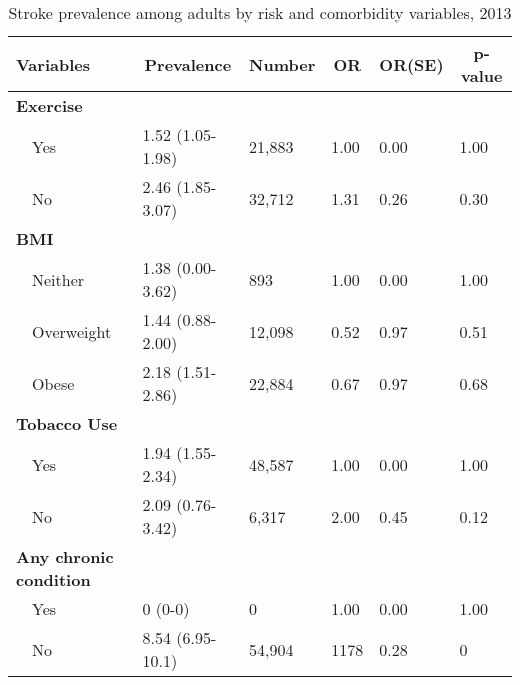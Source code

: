 
\begin{table}[H]
\caption{Stroke prevalence  among adults by risk and comorbidity variables, 2013\label{tab:riskComo.tabl}} 
\begin{center}
\begin{tabular}{llllll}
\hline\hline
\multicolumn{1}{l}{Variables}&\multicolumn{1}{c}{Prevalence}&\multicolumn{1}{c}{Number}&\multicolumn{1}{c}{OR}&\multicolumn{1}{c}{OR(SE)}&\multicolumn{1}{c}{p-value}\tabularnewline
\hline
{\bfseries Exercise}&&&&&\tabularnewline
~~Yes&1.52 (1.05-1.98)&21,883&1.00&0.00&1.00\tabularnewline
~~No&2.46 (1.85-3.07)&32,712&1.31&0.26&0.30\tabularnewline
\hline
{\bfseries BMI}&&&&&\tabularnewline
~~Neither&1.38 (0.00-3.62)&   893&1.00&0.00&1.00\tabularnewline
~~Overweight&1.44 (0.88-2.00)&12,098&0.52&0.97&0.51\tabularnewline
~~Obese&2.18 (1.51-2.86)&22,884&0.67&0.97&0.68\tabularnewline
\hline
{\bfseries Tobacco Use}&&&&&\tabularnewline
~~Yes&1.94 (1.55-2.34)&48,587&1.00&0.00&1.00\tabularnewline
~~No&2.09 (0.76-3.42)& 6,317&2.00&0.45&0.12\tabularnewline
\hline
{\bfseries Any chronic condition}&&&&&\tabularnewline
~~Yes&0 (0-0)&     0&1.00&0.00&1.00\tabularnewline
~~No&8.54 (6.95-10.1)&54,904&1178&0.28&0\tabularnewline
\hline
\end{tabular}\end{center}

\end{table}

